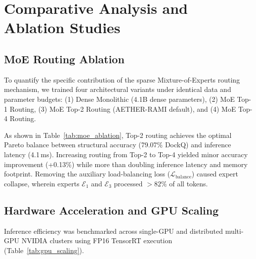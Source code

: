 \section{Comparative Analysis and Ablation Studies}
\label{sec:comparative}

\subsection{MoE Routing Ablation}
To quantify the specific contribution of the sparse Mixture-of-Experts routing mechanism, we trained four architectural variants under identical data and parameter budgets: (1) Dense Monolithic (4.1B dense parameters), (2) MoE Top-1 Routing, (3) MoE Top-2 Routing (AETHER-RAMI default), and (4) MoE Top-4 Routing.

\begin{table}[h]
\caption{Architectural Ablation of Mixture-of-Experts Gating}
\label{tab:moe_ablation}
\centering
\small
{}
\end{table}

As shown in Table~\ref{tab:moe_ablation}, Top-2 routing achieves the optimal Pareto balance between structural accuracy (79.07\% DockQ) and inference latency (4.1\,ms). Increasing routing from Top-2 to Top-4 yielded minor accuracy improvement (+0.13\%) while more than doubling inference latency and memory footprint. Removing the auxiliary load-balancing loss ($\mathcal{L}_{\text{balance}}$) caused expert collapse, wherein experts $\mathcal{E}_1$ and $\mathcal{E}_3$ processed $>82\%$ of all tokens.

\subsection{Hardware Acceleration and GPU Scaling}
Inference efficiency was benchmarked across single-GPU and distributed multi-GPU NVIDIA clusters using FP16 TensorRT execution (Table~\ref{tab:gpu_scaling}).

